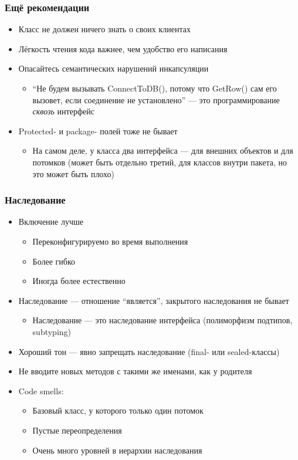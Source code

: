 \documentclass{../../slides-style}
\begin{document}
    \begin{frame}
        \frametitle{Ещё рекомендации}
        \begin{itemize}
            \item Класс не должен ничего знать о своих клиентах
            \item Лёгкость чтения кода важнее, чем удобство его написания
            \item Опасайтесь семантических нарушений инкапсуляции
            \begin{itemize}
                \item ``Не будем вызывать ConnectToDB(), потому что GetRow() сам его вызовет, если соединение не установлено'' --- это программирование \textit{сквозь} интерфейс
            \end{itemize}
            \item Protected- и package- полей тоже не бывает
            \begin{itemize}
                \item На самом деле, у класса два интерфейса --- для внешних объектов и для потомков (может быть отдельно третий, для классов внутри пакета, но это может быть плохо)
            \end{itemize}
        \end{itemize}
    \end{frame}

    \begin{frame}
        \frametitle{Наследование}
        \begin{itemize}
            \item Включение лучше
            \begin{itemize}
                \item Переконфигурируемо во время выполнения
                \item Более гибко
                \item Иногда более естественно
            \end{itemize}
            \item Наследование --- отношение ``является'', закрытого наследования не бывает
            \begin{itemize}
                \item Наследование --- это наследование интерфейса (полиморфизм подтипов, subtyping)
            \end{itemize}
            \item Хороший тон --- явно запрещать наследование (final- или sealed-классы)
            \item Не вводите новых методов с такими же именами, как у родителя
            \item Code smells:
            \begin{itemize}
                \item Базовый класс, у которого только один потомок
                \item Пустые переопределения
                \item Очень много уровней в иерархии наследования
            \end{itemize}
        \end{itemize}
    \end{frame}
\end{document}
